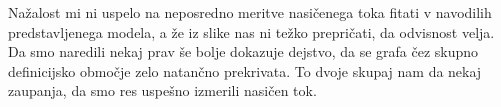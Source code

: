 \documentclass[12pt]{article}
\begin{document}
Nažalost mi ni uspelo na neposredno meritve nasičenega toka fitati v navodilih predstavljenega modela, a že iz slike nas ni težko prepričati, da odvisnost velja. Da smo naredili nekaj prav še bolje dokazuje dejstvo, da se grafa čez skupno definicijsko območje zelo natančno prekrivata. To dvoje skupaj nam da nekaj zaupanja, da smo res uspešno izmerili nasičen tok.
\end{document}
